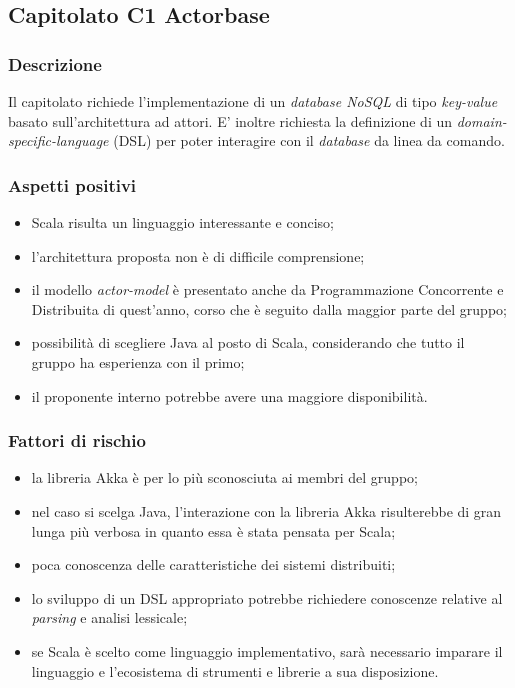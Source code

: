 \documentclass[12pt,a4paper]{article}
\begin{document}
\subsection{Capitolato C1 Actorbase}
\subsubsection{Descrizione}

Il capitolato richiede l'implementazione di un \textit{database NoSQL} di tipo \textit{key-value} basato
sull'architettura ad attori. E' inoltre richiesta la definizione di un \textit{domain-specific-language} (DSL)
per poter interagire con il \textit{database} da linea da comando.

\subsubsection{Aspetti positivi}
\begin{itemize}
\item Scala risulta un linguaggio interessante e conciso;
\item l'architettura proposta non è di difficile comprensione;
\item il modello \textit{actor-model} è presentato anche da Programmazione Concorrente e Distribuita di quest'anno, corso che è seguito dalla maggior parte del gruppo;
\item possibilità di scegliere Java al posto di Scala, considerando che tutto il gruppo ha esperienza con il primo;
\item il proponente interno potrebbe avere una maggiore disponibilità.
\end{itemize}

\subsubsection{Fattori di rischio}
\begin{itemize}
\item la libreria Akka è per lo più sconosciuta ai membri del gruppo;
\item nel caso si scelga Java, l'interazione con la libreria Akka risulterebbe di gran lunga più verbosa
in quanto essa è stata pensata per Scala;
\item poca conoscenza delle caratteristiche dei sistemi distribuiti;
\item lo sviluppo di un DSL appropriato potrebbe richiedere conoscenze relative al \textit{parsing} e 
analisi lessicale;
\item se Scala è scelto come linguaggio implementativo, sarà necessario imparare il linguaggio e l'ecosistema
di strumenti e librerie a sua disposizione.
\end{itemize}
\end{document}
